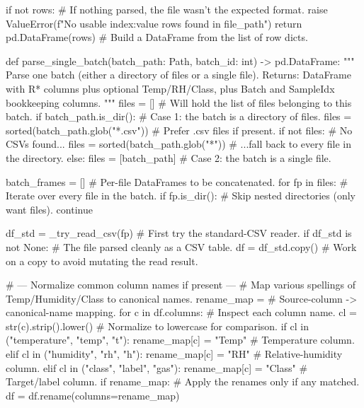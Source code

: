     if not rows:                           # If nothing parsed, the file wasn't the expected format.
        raise ValueError(f"No usable index:value rows found in {file_path}")
    return pd.DataFrame(rows)              # Build a DataFrame from the list of row dicts.

def parse_single_batch(batch_path: Path, batch_id: int) -> pd.DataFrame:
    """
    Parse one batch (either a directory of files or a single file).
    Returns: DataFrame with R* columns plus optional Temp/RH/Class,
             plus Batch and SampleIdx bookkeeping columns.
    """
    files = []                             # Will hold the list of files belonging to this batch.
    if batch_path.is_dir():                # Case 1: the batch is a directory of files.
        files = sorted(batch_path.glob("*.csv"))   # Prefer .csv files if present.
        if not files:                      # No CSVs found...
            files = sorted(batch_path.glob("*"))   # ...fall back to every file in the directory.
    else:
        files = [batch_path]               # Case 2: the batch is a single file.

    batch_frames = []                      # Per-file DataFrames to be concatenated.
    for fp in files:                       # Iterate over every file in the batch.
        if fp.is_dir():                    # Skip nested directories (only want files).
            continue

        df_std = _try_read_csv(fp)         # First try the standard-CSV reader.
        if df_std is not None:             # The file parsed cleanly as a CSV table.
            df = df_std.copy()             # Work on a copy to avoid mutating the read result.

            # --- Normalize common column names if present ---
            # Map various spellings of Temp/Humidity/Class to canonical names.
            rename_map = {}                # Source-column -> canonical-name mapping.
            for c in df.columns:           # Inspect each column name.
                cl = str(c).strip().lower()  # Normalize to lowercase for comparison.
                if cl in ("temperature", "temp", "t"):
                    rename_map[c] = "Temp"  # Temperature column.
                elif cl in ("humidity", "rh", "h"):
                    rename_map[c] = "RH"    # Relative-humidity column.
                elif cl in ("class", "label", "gas"):
                    rename_map[c] = "Class"  # Target/label column.
            if rename_map:                 # Apply the renames only if any matched.
                df = df.rename(columns=rename_map)

